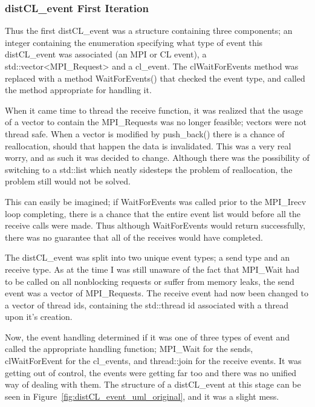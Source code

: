 \documentclass[../thesis.tex]{subfiles}
\begin{document}
        \subsubsection{distCL\_event First Iteration} %
        \label{ssub:distcl_event_first_iteration}
            Thus the first distCL\_event was a structure containing three components; an integer containing the enumeration specifying what type of event this distCL\_event was associated (an MPI or CL event), a std::vector<MPI\_Request> and a cl\_event. The clWaitForEvents method was replaced with a method WaitForEvents() that checked the event type, and called the method appropriate for handling it.

            When it came time to thread the receive function, it was realized that the usage of a vector to contain the MPI\_Requests was no longer feasible; vectors were not thread safe. When a vector is modified by push\_back() there is a chance of reallocation, should that happen the data is invalidated. This was a very real worry, and as such it was decided to change. Although there was the possibility of switching to a std::list which neatly sidesteps the problem of reallocation, the problem still would not be solved.

            This can easily be imagined; if WaitForEvents was called prior to the MPI\_Irecv loop completing, there is a chance that the entire event list would before all the receive calls were made. Thus although WaitForEvents would return successfully, there was no guarantee that all of the receives would have completed.

            The distCL\_event was split into two unique event types; a send type and an receive type. As at the time I was still unaware of the fact that MPI\_Wait had to be called on all nonblocking requests or suffer from memory leaks, the send event was a vector of MPI\_Requests. The receive event had now been changed to a vector of thread ids, containing the std::thread id associated with a thread upon it's creation.

            Now, the event handling determined if it was one of three types of event and called the appropriate handling function; MPI\_Wait for the sends, clWaitForEvent for the cl\_events, and thread::join for the receive events. It was getting out of control, the events were getting far too and there was no unified way of dealing with them. The structure of a distCL\_event at this stage can be seen in Figure~\ref{fig:distCL_event_uml_original}, and it was a slight mess.
\end{document}
